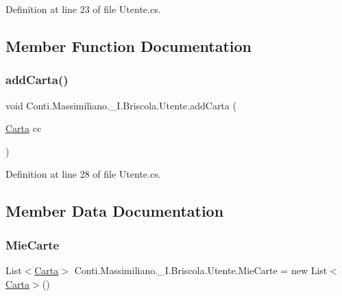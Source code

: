 Definition at line 23 of file Utente.\+cs.



\subsection{Member Function Documentation}
\hypertarget{class_conti_1_1_massimiliano_1_1__5_i_1_1_briscola_1_1_utente_aff18a6e19b71070cf158adfb50464428}{}\label{class_conti_1_1_massimiliano_1_1__5_i_1_1_briscola_1_1_utente_aff18a6e19b71070cf158adfb50464428} 
\subsubsection{\texorpdfstring{add\+Carta()}{addCarta()}}
{\footnotesize\ttfamily void Conti.\+Massimiliano.\+\_\+I.\+Briscola.\+Utente.\+add\+Carta (\begin{DoxyParamCaption}\item[{\hyperlink{class_conti_1_1_massimiliano_1_1__5_i_1_1_briscola_1_1_carta}{Carta}}]{cc }\end{DoxyParamCaption})}



Definition at line 28 of file Utente.\+cs.



\subsection{Member Data Documentation}
\hypertarget{class_conti_1_1_massimiliano_1_1__5_i_1_1_briscola_1_1_utente_ab369b8fe628b0418f5ce653e80a006ed}{}\label{class_conti_1_1_massimiliano_1_1__5_i_1_1_briscola_1_1_utente_ab369b8fe628b0418f5ce653e80a006ed} 
\subsubsection{\texorpdfstring{Mie\+Carte}{MieCarte}}
{\footnotesize\ttfamily List$<$\hyperlink{class_conti_1_1_massimiliano_1_1__5_i_1_1_briscola_1_1_carta}{Carta}$>$ Conti.\+Massimiliano.\+\_\+I.\+Briscola.\+Utente.\+Mie\+Carte = new List$<$\hyperlink{class_conti_1_1_massimiliano_1_1__5_i_1_1_briscola_1_1_carta}{Carta}$>$()}



